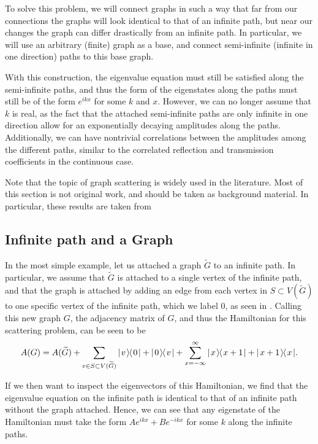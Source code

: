 \documentclass[../thesis-main/thesis-main]{subfiles}
\begin{document}
To solve this problem, we will connect graphs in such a way that far from our connections the graphs will look identical to that of an infinite path, but near our changes the graph can differ drastically from an infinite path.  In particular, we will use an arbitrary (finite) graph as a base, and connect semi-infinite (infinite in one direction) paths to this base graph.

With this construction, the eigenvalue equation must still be satisfied along the semi-infinite paths, and thus the form of the eigenstates along the paths must still be of the form $e^{i k x}$ for some $k$ and $x$.  However, we can no longer assume that $k$ is real, as the fact that the attached semi-infinite paths are only infinite in one direction allow for an exponentially decaying amplitudes along the paths.  Additionally, we can have nontrivial correlations between the amplitudes among the different paths, similar to the correlated reflection and transmission coefficients in the continuous case.

Note that the topic of graph scattering is widely used in the literature.  Most of this section is not original work, and should be taken as background material.  In particular, these results are taken from \cite{FGG08, Chi09, CS11, CG12}


\subsection{Infinite path and a Graph}\label{sec:infinite_path_and_graph}

In the most simple example, let us attached a graph $\widetilde{G}$ to an infinite path.  In particular, we assume that $\widetilde{G}$ is attached to a single vertex of the infinite path, and that the graph is attached by adding an edge from each vertex in $S\subset V(\widetilde{G})$ to one specific vertex of the infinite path, which we label $0$, as seen in .  Calling this new graph $G$, the adjacency matrix of $G$, and thus the Hamiltonian for this scattering problem, can be seen to be
\begin{equation}
  A(G) = A(\widetilde{G}) + \sum_{v\in S \subset V(\widetilde{G})} |\mspace{2mu} v \mspace{2mu} \rangle\mspace{-2mu}\langle\mspace{2mu} 0 \mspace{2mu} | + |\mspace{2mu} 0 \mspace{2mu} \rangle\mspace{-2mu}\langle\mspace{2mu} v \mspace{2mu} | + \sum_{x=-\infty}^\infty |\mspace{2mu} x \mspace{2mu} \rangle\mspace{-2mu}\langle\mspace{2mu} x+1 \mspace{2mu} | + |\mspace{2mu} x+1 \mspace{2mu} \rangle\mspace{-2mu}\langle\mspace{2mu} x \mspace{2mu} |.
\end{equation}

If we then want to inspect the eigenvectors of this Hamiltonian, we find that the eigenvalue equation on the infinite path is identical to that of an infinite path without the graph attached.  Hence, we can see that any eigenstate of the Hamiltonian must take the form $Ae^{i k x} + Be^{-i k x}$ for some $k$ along the infinite paths.  
\end{document}
